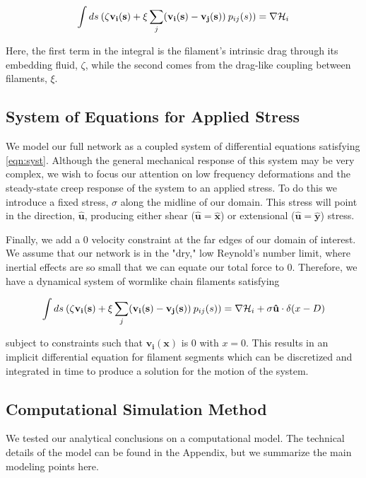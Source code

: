 \documentclass[pre,preprint]{revtex4-1}
\begin{document}
\begin{equation}
\label{eqn:syst}
\int ds \: (\mathbf{\zeta v_i(s)} + \xi \sum _j(\mathbf{v_i(s)}-\mathbf{v_j(s)}) \: p_{ij}(s))= \nabla {\cal H}_i
\end{equation}

Here, the first term in the integral is the filament's intrinsic drag through its embedding fluid, $\zeta$, while the second comes from the drag-like coupling between filaments, $\xi$.  


\subsection{System of Equations for Applied Stress}
We model our full network as a coupled system of differential equations satisfying \ref{eqn:syst}.  Although the general mechanical response of this system may be very complex, we wish to focus our attention on low frequency deformations and the steady-state creep response of the system to an applied stress.  To do this we introduce a fixed stress, $\sigma$ along the midline of our domain.  This stress will point in the direction, $\mathbf{\hat{u}}$, producing either shear ($\mathbf{\hat{u}}=\mathbf{\hat{x}}$) or extensional ($\mathbf{\hat{u}}=\mathbf{\hat{y}}$) stress.

Finally, we add a 0 velocity constraint at the far edges of our domain of interest.  We assume that our network is in the "dry," low Reynold's number limit, where inertial effects are so small that we can equate our total force to 0.  Therefore, we have a dynamical system of wormlike chain filaments satisfying 

\begin{equation}
\int ds \: (\zeta\mathbf{v_i(s)} + \xi \sum _j(\mathbf{v_i(s)}-\mathbf{v_j(s)}) \: p_{ij}(s)) = \nabla {\cal H}_i + \sigma\mathbf{\hat{u}}\cdot\delta(x-D)
\end{equation}

subject to constraints such that $\mathbf{v_i(x)}$ is 0 with $x=0$.  This results in an implicit differential equation for filament segments which can be discretized and integrated in time to produce a solution for the motion of the system.


\subsection{Computational Simulation Method}

We tested our analytical conclusions on a computational model.  The technical details of the model can be found in the Appendix, but we summarize the main modeling points here.
\end{document}
